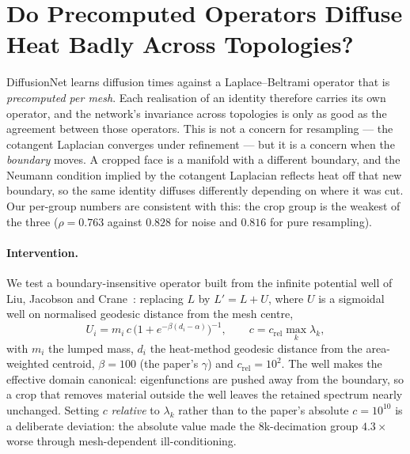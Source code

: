 \documentclass{article}
\begin{document}
\section{Do Precomputed Operators Diffuse Heat Badly Across Topologies?}
\label{sec:supp_potential}

DiffusionNet learns diffusion times against a Laplace--Beltrami operator that is
\emph{precomputed per mesh}. Each realisation of an identity therefore carries its own
operator, and the network's invariance across topologies is only as good as the agreement
between those operators. This is not a concern for resampling --- the cotangent Laplacian
converges under refinement --- but it is a concern when the \emph{boundary} moves. A cropped
face is a manifold with a different boundary, and the Neumann condition implied by the
cotangent Laplacian reflects heat off that new boundary, so the same identity diffuses
differently depending on where it was cut. Our per-group numbers are consistent with this:
the crop group is the weakest of the three ($\rho = 0.763$ against $0.828$ for noise and
$0.816$ for pure resampling).

\paragraph{Intervention.} We test a boundary-insensitive operator built from the infinite
potential well of Liu, Jacobson and Crane~\cite{liu2017dirac}: replacing $L$ by
$L' = L + U$, where $U$ is a sigmoidal well on normalised geodesic distance from the mesh
centre,
\begin{equation}
U_i = m_i \, c \, \bigl(1 + e^{-\beta (d_i - \alpha)}\bigr)^{-1},
\qquad
c = c_{\mathrm{rel}} \max_k \lambda_k ,
\end{equation}
with $m_i$ the lumped mass, $d_i$ the heat-method geodesic distance from the area-weighted
centroid, $\beta = 100$ (the paper's $\gamma$) and $c_{\mathrm{rel}} = 10^{2}$. The well makes
the effective domain canonical: eigenfunctions are pushed away from the boundary, so a crop
that removes material outside the well leaves the retained spectrum nearly unchanged. Setting
$c$ \emph{relative} to $\lambda_k$ rather than to the paper's absolute $c = 10^{10}$ is a
deliberate deviation: the absolute value made the $8$k-decimation group $4.3\times$ worse
through mesh-dependent ill-conditioning.
\end{document}
